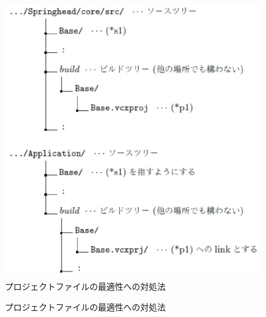 \begin{narrow}[20pt]
\ifLwarp
	\begin{figure}[h]
	    \begin{center}
	    \includegraphics[width=.9\textwidth]{fig/ApproachToProjfileOptimization.eps}
	    \end{center}
	    \caption{プロジェクトファイルの最適性への対処法}
	    \label{fig:ApproachToProjfileOptimization}
	\end{figure}
\else
	\begin{figure}[h]
    	\begin{narrow}[40pt]\begin{minipage}{\textwidth}
		{\footnotesize{}}
		\medskip
    	\end{minipage}\end{narrow}
    	\begin{narrow}[40pt]\begin{minipage}{\textwidth}
		{\footnotesize{}}
		\medskip
  	\end{minipage}\end{narrow}
	\caption{プロジェクトファイルの最適性への対処法}
	\label{fig:ApproachToProjfileOptimization}
	\end{figure}
\fi
	\indent
	
\end{narrow}

